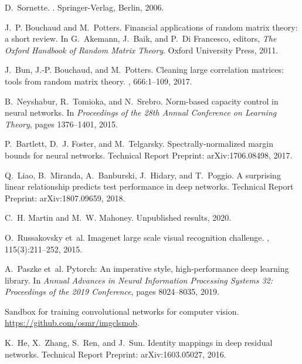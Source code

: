 \documentclass[11pt]{article}
\begin{document}
{\begin{thebibliography}{10}
D.~Sornette.
.
\newblock Springer-Verlag, Berlin, 2006.

J.~P. Bouchaud and M.~Potters.
\newblock Financial applications of random matrix theory: a short review.
\newblock In G.~Akemann, J.~Baik, and P.~Di Francesco, editors, {\em The Oxford
  Handbook of Random Matrix Theory}. Oxford University Press, 2011.

J.~Bun, J.-P. Bouchaud, and M.~Potters.
\newblock Cleaning large correlation matrices: tools from random matrix theory.
, 666:1--109, 2017.

B.~Neyshabur, R.~Tomioka, and N.~Srebro.
\newblock Norm-based capacity control in neural networks.
\newblock In {\em Proceedings of the 28th Annual Conference on Learning
  Theory}, pages 1376--1401, 2015.

P.~Bartlett, D.~J. Foster, and M.~Telgarsky.
\newblock Spectrally-normalized margin bounds for neural networks.
\newblock Technical Report Preprint: arXiv:1706.08498, 2017.

Q.~Liao, B.~Miranda, A.~Banburski, J.~Hidary, and T.~Poggio.
\newblock A surprising linear relationship predicts test performance in deep
  networks.
\newblock Technical Report Preprint: arXiv:1807.09659, 2018.

C.~H. Martin and M.~W. Mahoney.
\newblock Unpublished results, 2020.

O.~Russakovsky et~al.
\newblock Imagenet large scale visual recognition challenge.
, 115(3):211--252,
  2015.

A.~Paszke et~al.
\newblock Pytorch: An imperative style, high-performance deep learning library.
\newblock In {\em Annual Advances in Neural Information Processing Systems 32:
  Proceedings of the 2019 Conference}, pages 8024--8035, 2019.

{Sandbox for training convolutional networks for computer vision}.
\newblock \url{https://github.com/osmr/imgclsmob}.

K.~He, X.~Zhang, S.~Ren, and J.~Sun.
\newblock Identity mappings in deep residual networks.
\newblock Technical Report Preprint: arXiv:1603.05027, 2016.


\end{thebibliography}}
\end{document}

